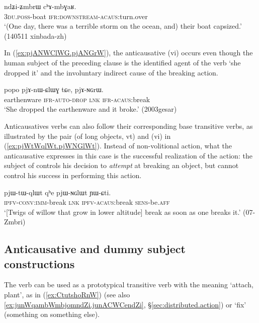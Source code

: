 \begin{exe}
\ex \label{ex:ndZimbrW.chAmbGAR}
\gll   ndʑi-ʑmbrɯ cʰɤ-mbɣaʁ. \\
 \textsc{3du}.\textsc{poss}-boat \textsc{ifr}:\textsc{downstream}-\textsc{acaus}:turn.over \\
\glt `(One day, there was a terrible storm  on the ocean, and) their boat capsized.' (140511 xinbada-zh) 
\end{exe}

In (\ref{ex:pjANWClWG.pjANGrW}), the anticausative  (vi) occurs even though the human subject of the preceding clause is the identified agent of the verb  `she dropped it' and the involuntary indirect cause of the breaking action.

\begin{exe}
\ex \label{ex:pjANWClWG.pjANGrW}
\gll popo pjɤ-nɯ-ɕlɯɣ tɕe, pjɤ-ɴɢrɯ. \\
earthenware \textsc{ifr}-\textsc{auto}-\textsc{drop} \textsc{lnk} \textsc{ifr}-\textsc{acaus}:break \\
\glt `She dropped the earthenware and it broke.' (2003gesar)
\end{exe}

Anticausatives verbs can also follow their corresponding base transitive verbs, as illustrated by the pair  (of long objects, vt) and  (vi) in (\ref{ex:pjWtWqlWt.pjWNGlWt}). Instead of non-volitional action, what the anticausative   expresses in this case is the successful realization of the action: the subject of  controls his decision to \textit{attempt} at breaking an object, but cannot control his success in performing this action.

\begin{exe}
\ex \label{ex:pjWtWqlWt.pjWNGlWt} 
\gll pjɯ-tɯ-qlɯt qʰe pjɯ-ɴɢlɯt ɲɯ-ɕti. \\
\textsc{ipfv}-\textsc{conv}:\textsc{imm}-break \textsc{lnk} \textsc{ipfv}-\textsc{acaus}:break \textsc{sens}-be.\textsc{aff} \\
\glt `[Twigs of willow that grow in lower altitude] break as soon as one breaks it.' (07-Zmbri) 	
\end{exe}

\subsection{Anticausative and dummy subject constructions} \label{sec:anticausative.dummy}
The verb  can be used as a prototypical transitive verb with the meaning `attach, plant', as in (\ref{ex:CtutshoRnW}) (see also \ref{ex:junWqambWmbjomndZi.junACWCendZi}, §\ref{sec:distributed.action}) or `fix' (something on something else).

